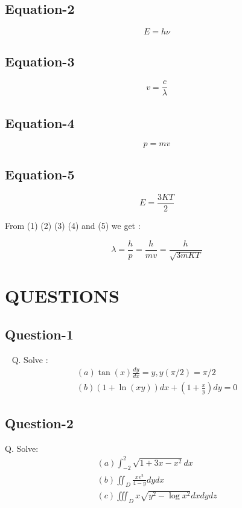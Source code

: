 \documentclass{article}
\begin{document}
\subsection{Equation-2}

\begin{equation}
	E=h\nu
\end{equation}

\subsection{Equation-3}

\begin{equation}
	v=\frac{c}{\lambda}
\end{equation}

\subsection{Equation-4}

\begin{equation}
	p=mv
\end{equation}

\subsection{Equation-5}

\begin{equation}
	E = \frac{3KT}{2}
\end{equation}

From (1) (2) (3) (4) and (5) we get :

\begin{equation*}
	\lambda = \frac{h}{p} = \frac{h}{mv} = \frac{h}{\sqrt{3mKT}}
\end{equation*}

\section{QUESTIONS}	
\subsection{Question-1}
~\cite{6}
Q. Solve :
\begin{align}
	(a) \tan(x) \frac{dy}{dx} = y , y(\pi / 2) = \pi/2\\
	(b) (1+\ln(xy))dx + (1+\frac{x}{y})dy=0
\end{align}

\subsection{Question-2}
Q. Solve:
\begin{align*}
	(a) \int_{-2}^{2} \sqrt{1+3x-x^2} dx\\
	(b) \iint_{D} \frac{xe^2}{4-y} dy dx\\
	(c) \iiint_{D} x \sqrt{y^2 - \log{x^2}} dx dy dz
\end{align*}
\end{document}
